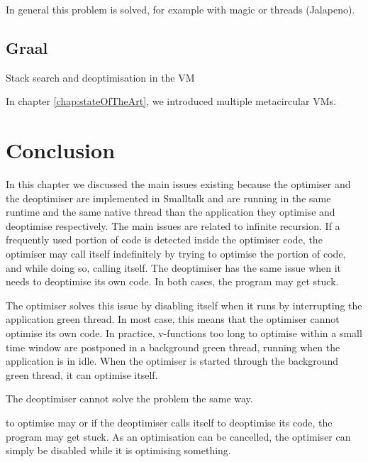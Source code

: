 \documentclass[a4paper,12pt,twoside]{../includes/ThesisStyle}
\begin{document}
In general this problem is solved, for example with magic or threads (Jalapeno).

\subsection{Graal}

Stack search and deoptimisation in the VM


In chapter \ref{chap:stateOfTheArt}, we introduced multiple metacircular VMs. 

\section{Conclusion}

In this chapter we discussed the main issues existing because the optimiser and the deoptimiser are implemented in Smalltalk and are running in the same runtime and the same native thread than the application they optimise and deoptimise respectively. The main issues are related to infinite recursion. If a frequently used portion of code is detected inside the optimiser code, the optimiser may call itself indefinitely by trying to optimise the portion of code, and while doing so, calling itself. The deoptimiser has the same issue when it needs to deoptimise its own code. In both cases, the program may get stuck.

The optimiser solves this issue by disabling itself when it runs by interrupting the application green thread. In most case, this means that the optimiser cannot optimise its own code. In practice, v-functions too long to optimise within a small time window are postponed in a background green thread, running when the application is in idle. When the optimiser is started through the background green thread, it can optimise itself.

The deoptimiser cannot solve the problem the same way.

 to optimise may  or if the deoptimiser calls itself to deoptimise its code, the program may get stuck. As an optimisation can be cancelled, the optimiser can simply be disabled while it is optimising something. 


\ifx\wholebook\relax\else
    
\end{document}
